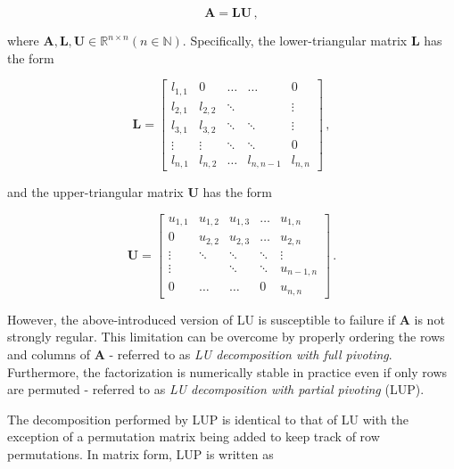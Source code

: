 \begin{equation}
	\mathbf{A} = \mathbf{LU} \,,
\end{equation}

where $\mathbf{A},\mathbf{L},\mathbf{U} \in \mathbb{R}^{n\times n} \left( n \in \mathbb{N} \right)$.
Specifically, the lower-triangular matrix $\mathbf{L}$ has the form

\begin{equation}
	\mathbf{L} = {
		\begin{bmatrix}
			l_{1,1} & 0		  & \ldots & \ldots    & 0 		 \\
			l_{2,1} & l_{2,2} & \ddots & 		   & \vdots	 \\
			l_{3,1} & l_{3,2} & \ddots & \ddots	   & \vdots	 \\
			\vdots	& \vdots  & \ddots & \ddots    & 0		 \\
			l_{n,1} & l_{n,2} & \ldots & l_{n,n-1} & l_{n,n}
		\end{bmatrix}
	} \,,
\end{equation}

and the upper-triangular matrix $\mathbf{U}$ has the form

\begin{equation}
	\mathbf{U} = {
		\begin{bmatrix}
			u _{1,1} & u _{1,2} & u _{1,3} & \ldots & u _{1,n}   \\
			0 		 & u _{2,2} & u _{2,3} & \ldots & u _{2,n}   \\
			\vdots   & \ddots 	& \ddots   & \ddots & \vdots 	 \\
			\vdots   & 			& \ddots   & \ddots & u _{n-1,n} \\
			0 		 & \ldots	& \ldots   & 0 		& u _{n,n}
		\end{bmatrix}
	} \,.
\end{equation}

However, the above-introduced version of LU is susceptible to failure if $\mathbf{A}$ is not strongly regular.
This limitation can be overcome by properly ordering the rows and columns of $\mathbf{A}$ - referred to as \textit{LU decomposition with full pivoting}.
Furthermore, the factorization is numerically stable in practice even if only rows are permuted \cite{Trefethen1997} - referred to as \textit{LU decomposition with partial pivoting} (LUP).

The decomposition performed by LUP is identical to that of LU with the exception of a permutation matrix being added to keep track of row permutations.
In matrix form, LUP is written as

